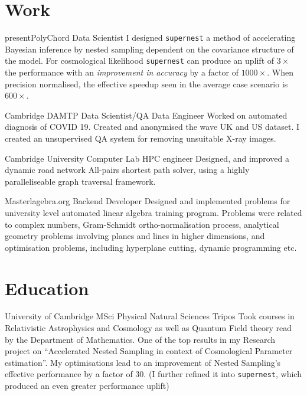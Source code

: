 \documentclass{CurriculumVitae}[10pt, condensed]
\author{Aleksandr Petrosyan} \date{\today}
\begin{document}
\maketitle
 \section*{Work}
 {\setlength{\parindent}{0in}
    {present}{PolyChord}
   {Data Scientist}{ I designed \texttt{supernest} a method of
     accelerating Bayesian inference by nested sampling dependent on
     the covariance structure of the model.  For cosmological
     likelihood \texttt{supernest} can produce an uplift of $3\times$
     the performance with an \emph{improvement in accuracy} by a
     factor of \(1000\times\). When precision normalised, the
     effective speedup seen in the average case scenario is
     \(600\times\).  }
 
 
    {Cambridge DAMTP} {Data Scientist/QA Data
     Engineer} {Worked on automated diagnosis of COVID 19. Created and
     anonymised the  wave UK and US dataset. I created an
     unsupervised QA system for removing unsuitable X-ray images.}
   
    {Cambridge University Computer Lab}
   {HPC engineer} {Designed, and improved a dynamic
     road network All-pairs shortest path solver, using a highly
     paralleliseable graph traversal framework. }

   
    {Masterlagebra.org} {Backend Developer}
   {Designed and implemented problems for university level automated
     linear algebra training program. Problems were related to complex
     numbers, Gram-Schmidt ortho-normalisation process, analytical
     geometry problems involving planes and lines in higher
     dimensions, and optimisation problems, including hyperplane
     cutting, dynamic programming etc. }

   \section*{Education}
    {University of Cambridge} {MSci } {
     Physical Natural Sciences Tripos} {Took courses in Relativistic
     Astrophysics and Cosmology as well as Quantum Field theory read
     by the Department of Mathematics. One of the top results in my
     Research project on ``Accelerated Nested Sampling in context of
     Cosmological Parameter estimation''. My optimisations lead to an
     improvement of Nested Sampling's effective performance by a
     factor of 30. (I further refined it into \texttt{supernest},
     which produced an even greater performance uplift)}
   
}
\end{document}
